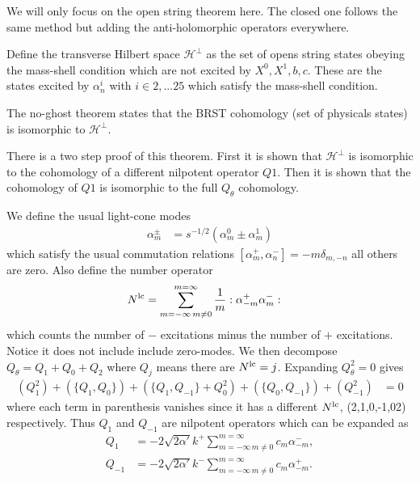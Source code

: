 \documentclass[notitlepage,amsmath,amssymb,aps, pra, 10pt]{revtex4-1}
\begin{document}
    We will only focus on the open string theorem here. The closed one follows the same method but adding the anti-holomorphic operators everywhere.

    Define the transverse Hilbert space $\mathcal{H}^{\perp}$ as the set of opens string states obeying the mass-shell condition which are not excited by $X^0, X^1, b, c$. These are the states excited by $\alpha^i_{n}$ with $i \in {2, ...25}$ which satisfy the mass-shell condition.

    The no-ghost theorem states that the BRST cohomology (set of physicals states) is isomorphic to $\mathcal{H}^{\perp}$.

     There is a two step proof of this theorem. First it is shown that $\mathcal{H}^{\perp}$ is isomorphic to the cohomology of a different nilpotent operator $Q1$. Then it is shown that the cohomology of $Q1$ is isomorphic to the full $Q_{\theta}$ cohomology.

     We define the usual light-cone modes
     \begin{align}
       \alpha_m^{\pm} &= s^{-1/2} ( \alpha^0_m \pm \alpha^1_m)
     \end{align}
     which satisfy the usual commutation relations $[\alpha_m^+, \alpha_n ^-] = -m \delta_{m, -n}$ all others are zero. Also define the number operator
     \begin{align}
       N^{\rm lc} &= \sum_{m = -\infty\, m\neq 0} ^{m = \infty} \frac{1}{m} : \alpha^+_{-m} \alpha^-_{m}:
     \end{align}
    which counts the number of $-$ excitations minus the number of $+$ excitations. Notice it does not include include zero-modes. We then decompose $Q_{\theta} = Q_1 + Q_0 + Q_2$ where $Q_j$ means there are $N^{\rm lc} = j$. Expanding $Q_{\theta}^2 = 0$ gives
    \begin{align}
      (Q_1^2) + (\{Q_1, Q_0\}) + (\{ Q_1, Q_{-1} \} + Q_0^2) + (\{Q_0, Q_{-1}\}) + (Q_{-1}^2) &= 0
    \end{align}
    where each term in parenthesis vanishes since it has a different $N^{\rm lc}$, (2,1,0,-1,02) respectively. Thus $Q_1$ and $Q_{-1}$ are nilpotent operators which can be expanded as
    \begin{align}
        Q_1 &= -2 \sqrt{2\alpha'} k^+ \sum_{m = -\infty\, m\neq 0} ^{m = \infty} c_m \alpha_{-m}^-,\\
        Q_{-1} &= -2 \sqrt{2\alpha'} k^- \sum_{m = -\infty\, m\neq 0} ^{m = \infty} c_m \alpha_{-m}^+.
    \end{align}
\end{document}
